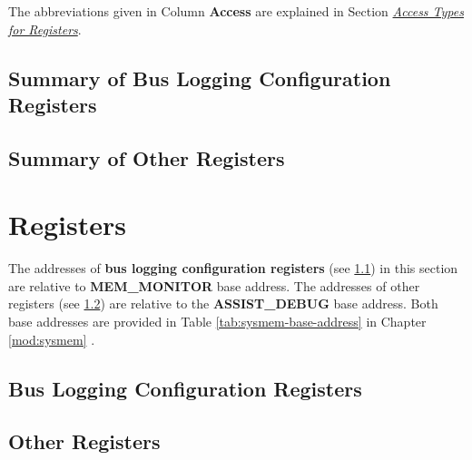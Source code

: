 \documentclass[main\_\_EN.tex]{subfiles}
\begin{document}
The abbreviations given in Column \textbf{Access} are explained in Section \hyperref[glossary-access-types]{\textit{Access Types for Registers}}.

\subsection{Summary of Bus Logging Configuration Registers}
\label{sec:dbgassist-mem-monitor-reg-summ}



\subsection{Summary of Other Registers}
\label{sec:dbgassist-bus-monitor-reg-summ}





\section{Registers}

The addresses of \textbf{bus logging configuration registers} (see \ref{sec:dbgassist-mem-monitor-reg}) in this section are relative to \textbf{MEM\_MONITOR} base address. The addresses of other registers (see \ref{sec:dbgassist-bus-monitor-reg}) are relative to the \textbf{ASSIST\_DEBUG} base address. Both base addresses are provided in Table \ref{tab:sysmem-base-address} in Chapter \ref{mod:sysmem} \textit{}.

\subsection{Bus Logging Configuration Registers}
\label{sec:dbgassist-mem-monitor-reg}



\subsection{Other Registers}
\label{sec:dbgassist-bus-monitor-reg}


\end{document}
